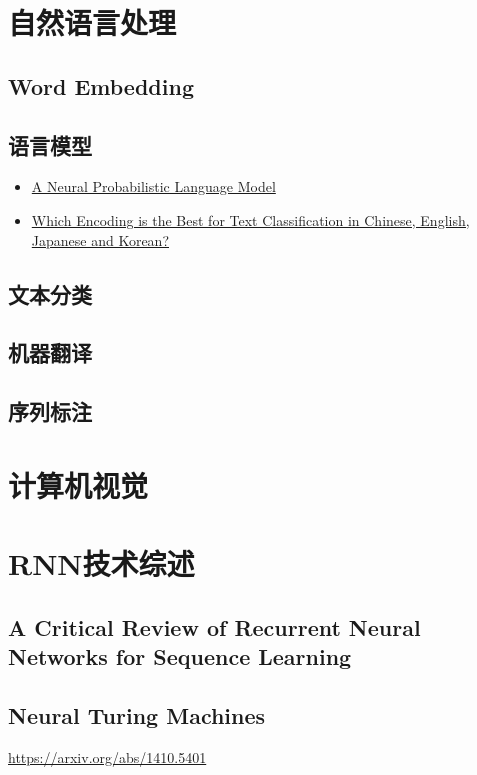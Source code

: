\documentclass[UTF8,11pt,a4paper]{ctexart}
\begin{document}
\section{自然语言处理}
\subsection{Word Embedding}

\subsection{语言模型}
\begin{itemize}
\item \href{http://www.jmlr.org/papers/volume3/bengio03a/bengio03a.pdf}{A Neural Probabilistic Language Model}
\item \href{https://arxiv.org/pdf/1708.02657.pdf}{Which Encoding is the Best for Text Classification in Chinese, English, Japanese and Korean?}
\end{itemize}



\subsection{文本分类}
\subsection{机器翻译}
\subsection{序列标注}


\section{计算机视觉}




\section{RNN技术综述}

\subsection{A Critical Review of Recurrent Neural Networks for Sequence Learning}

\subsection{Neural Turing Machines}
\href{Neural Turing Machines}{https://arxiv.org/abs/1410.5401}
\end{document}
